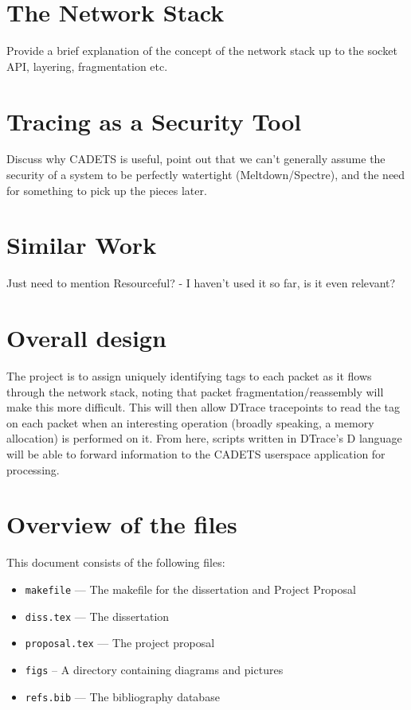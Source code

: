 \documentclass[a4paper,12pt,twoside,openright]{report}
\begin{document}
	\section{The Network Stack}
	
	Provide a brief explanation of the concept of the network stack up to the socket API, layering, fragmentation etc.
	
	\section{Tracing as a Security Tool}
	
	Discuss why CADETS is useful, point out that we can't generally assume the security of a system to be perfectly watertight (Meltdown/Spectre), and the need for something to pick up the pieces later.
	
	\section{Similar Work}
	
	Just need to mention Resourceful? - I haven't used it so far, is it even relevant?
	
	\section{Overall design}
	
	The project is to assign uniquely identifying tags to each packet as it flows through the network stack, noting that packet fragmentation/reassembly will make this more difficult. This will then allow DTrace tracepoints to read the tag on each packet when an interesting operation (broadly speaking, a memory allocation) is performed on it. From here, scripts written in DTrace's D language will be able to forward information to the CADETS userspace application for processing.
	
	
	\section{Overview of the files}
	
	This document consists of the following files:
	
	\begin{itemize}
		\item \texttt{makefile} --- The makefile for the dissertation and
		Project Proposal
		\item \texttt{diss.tex} --- The dissertation
		\item \texttt{proposal.tex}  --- The project proposal 
		\item \texttt{figs} -- A directory containing diagrams and pictures
		\item \texttt{refs.bib} --- The bibliography database
	\end{itemize}
	
\end{document}
